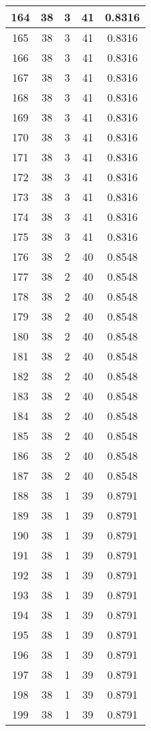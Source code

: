 \documentclass[letterpaper, 12pt]{article}
\begin{document}
\begin{longtable}{|c|c|c|c|c|}
\hline
164 & 38 & 3 & 41 & 0.8316 \\
\hline
165 & 38 & 3 & 41 & 0.8316 \\
\hline
166 & 38 & 3 & 41 & 0.8316 \\
\hline
167 & 38 & 3 & 41 & 0.8316 \\
\hline
168 & 38 & 3 & 41 & 0.8316 \\
\hline
169 & 38 & 3 & 41 & 0.8316 \\
\hline
170 & 38 & 3 & 41 & 0.8316 \\
\hline
171 & 38 & 3 & 41 & 0.8316 \\
\hline
172 & 38 & 3 & 41 & 0.8316 \\
\hline
173 & 38 & 3 & 41 & 0.8316 \\
\hline
174 & 38 & 3 & 41 & 0.8316 \\
\hline
175 & 38 & 3 & 41 & 0.8316 \\
\hline
176 & 38 & 2 & 40 & 0.8548 \\
\hline
177 & 38 & 2 & 40 & 0.8548 \\
\hline
178 & 38 & 2 & 40 & 0.8548 \\
\hline
179 & 38 & 2 & 40 & 0.8548 \\
\hline
180 & 38 & 2 & 40 & 0.8548 \\
\hline
181 & 38 & 2 & 40 & 0.8548 \\
\hline
182 & 38 & 2 & 40 & 0.8548 \\
\hline
183 & 38 & 2 & 40 & 0.8548 \\
\hline
184 & 38 & 2 & 40 & 0.8548 \\
\hline
185 & 38 & 2 & 40 & 0.8548 \\
\hline
186 & 38 & 2 & 40 & 0.8548 \\
\hline
187 & 38 & 2 & 40 & 0.8548 \\
\hline
188 & 38 & 1 & 39 & 0.8791 \\
\hline
189 & 38 & 1 & 39 & 0.8791 \\
\hline
190 & 38 & 1 & 39 & 0.8791 \\
\hline
191 & 38 & 1 & 39 & 0.8791 \\
\hline
192 & 38 & 1 & 39 & 0.8791 \\
\hline
193 & 38 & 1 & 39 & 0.8791 \\
\hline
194 & 38 & 1 & 39 & 0.8791 \\
\hline
195 & 38 & 1 & 39 & 0.8791 \\
\hline
196 & 38 & 1 & 39 & 0.8791 \\
\hline
197 & 38 & 1 & 39 & 0.8791 \\
\hline
198 & 38 & 1 & 39 & 0.8791 \\
\hline
199 & 38 & 1 & 39 & 0.8791 \\
\hline
\end{longtable}
\end{document}
